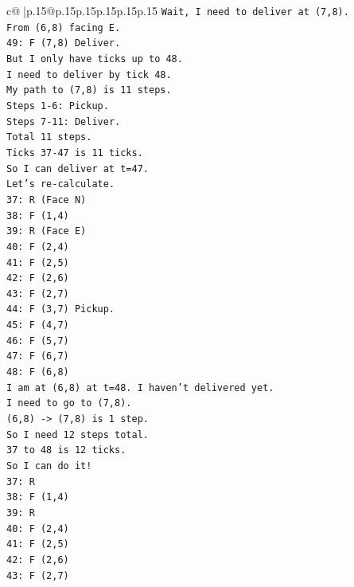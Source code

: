 \documentclass{article}
\begin{document}
{\begin{supertabular}{c@{$\;$}|p{.15\linewidth}@{}p{.15\linewidth}p{.15\linewidth}p{.15\linewidth}p{.15\linewidth}p{.15\linewidth}}
{{{\texttt{Wait, I need to deliver at (7,8).} \\
\texttt{From (6,8) facing E.} \\
\texttt{49: F (7,8) Deliver.} \\
\texttt{But I only have ticks up to 48.} \\
\texttt{I need to deliver by tick 48.} \\
\texttt{My path to (7,8) is 11 steps.} \\
\texttt{Steps 1{-}6: Pickup.} \\
\texttt{Steps 7{-}11: Deliver.} \\
\texttt{Total 11 steps.} \\
\texttt{Ticks 37{-}47 is 11 ticks.} \\
\texttt{So I can deliver at t=47.} \\
\texttt{Let's re{-}calculate.} \\
\texttt{37: R (Face N)} \\
\texttt{38: F (1,4)} \\
\texttt{39: R (Face E)} \\
\texttt{40: F (2,4)} \\
\texttt{41: F (2,5)} \\
\texttt{42: F (2,6)} \\
\texttt{43: F (2,7)} \\
\texttt{44: F (3,7) Pickup.} \\
\texttt{45: F (4,7)} \\
\texttt{46: F (5,7)} \\
\texttt{47: F (6,7)} \\
\texttt{48: F (6,8)} \\
\texttt{I am at (6,8) at t=48. I haven't delivered yet.} \\
\texttt{I need to go to (7,8).} \\
\texttt{(6,8) {-}> (7,8) is 1 step.} \\
\texttt{So I need 12 steps total.} \\
\texttt{37 to 48 is 12 ticks.} \\
\texttt{So I can do it!} \\
\texttt{37: R} \\
\texttt{38: F (1,4)} \\
\texttt{39: R} \\
\texttt{40: F (2,4)} \\
\texttt{41: F (2,5)} \\
\texttt{42: F (2,6)} \\
\texttt{43: F (2,7)} \\
}}}
\end{supertabular}}
\end{document}
